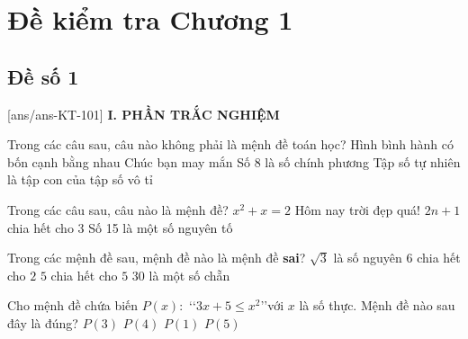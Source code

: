 \section*{Đề kiểm tra Chương 1}
\subsection*{Đề số 1}
\setcounter{ex}{0}\setcounter{bt}{0}
[ans/ans-KT-101]
\noindent\textbf{I. PHẦN TRẮC NGHIỆM}
\begin{ex}%
	Trong các câu sau, câu nào không phải là mệnh đề toán học?
	\choice
	{Hình bình hành có bốn cạnh bằng nhau}
	{\True Chúc bạn may mắn}
	{Số $8$ là số chính phương}
	{Tập số tự nhiên là tập con của tập số vô tỉ}
\end{ex}
\begin{ex}%
	Trong các câu sau, câu nào là mệnh đề?
	\choice
	{$x^2+x=2$}
	{Hôm nay trời đẹp quá!}
	{$2n+1$ chia hết cho 3}
	{\True Số 15 là một số nguyên tố}
\end{ex}
\begin{ex}%
	Trong các mệnh đề sau, mệnh đề nào là mệnh đề \textbf{sai}?
	\choice
	{\True $\sqrt{3}$ là số nguyên}
	{$6$ chia hết cho $2$}
	{$5$ chia hết cho $5$}
	{$30$ là một số chẵn}
\end{ex}
\begin{ex}%
	Cho mệnh đề chứa biến $P(x)\colon$ \lq\lq $3x+5\le x^2$\rq\rq với $x$ là số thực. Mệnh đề nào sau đây là đúng?
	\choice
	{$P(3)$}
	{$P(4)$}
	{$P(1)$}
	{\True $P(5)$}
\end{ex}
